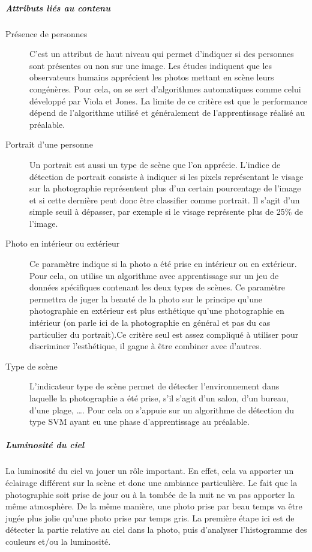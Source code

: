 \documentclass[11pt, french]{report-rd-info}
\begin{document}
\subparagraph{Attributs liés au contenu}
\begin{description}
\item[Présence de personnes]
C’est un attribut de haut niveau qui permet d’indiquer si des personnes sont présentes ou non sur une image. Les études indiquent que les observateurs humains apprécient les photos mettant en scène leurs congénères. Pour cela, on se sert d’algorithmes automatiques comme celui développé par Viola et Jones. La limite de ce critère est que le performance dépend de l’algorithme utilisé et généralement de l’apprentissage réalisé au préalable.


\item[Portrait d'une personne]
Un portrait est aussi un type de scène que l’on apprécie. L’indice de détection de portrait consiste à indiquer si les pixels représentant le visage sur la photographie représentent plus d’un certain pourcentage de l’image et si cette dernière peut donc être classifier comme portrait. Il s’agit d’un simple seuil à dépasser, par exemple si le visage représente plus de 25\% de l’image.


\item[Photo en intérieur ou extérieur]
Ce paramètre indique si la photo a été prise en intérieur ou en extérieur. Pour cela, on utilise un algorithme avec apprentissage sur un jeu de données spécifiques contenant les deux types de scènes. Ce paramètre permettra de juger la beauté de la photo sur le principe qu’une photographie en extérieur est plus esthétique qu’une photographie en intérieur (on parle ici de la photographie en général et pas du cas particulier du portrait).Ce critère seul est assez compliqué à utiliser pour discriminer l’esthétique, il gagne à être combiner avec d’autres.


\item[Type de scène]
L’indicateur type de scène permet de détecter l’environnement dans laquelle la photographie a été prise, s’il s’agit d’un salon, d’un bureau, d’une plage, \ldots. Pour cela on s’appuie sur un algorithme de détection du type SVM ayant eu une phase d’apprentissage au préalable.


\end{description}


\subparagraph{Luminosité du ciel}
La luminosité du ciel va jouer un rôle important. En effet, cela va apporter un éclairage différent sur la scène et donc une ambiance particulière. Le fait que la photographie soit prise de jour ou à la tombée de la nuit ne va pas apporter la même atmosphère. De la même manière, une photo prise par beau temps va être jugée plus jolie qu’une photo prise par temps gris. La première étape ici est de détecter la partie relative au ciel dans la photo, puis d’analyser l’histogramme des couleurs et/ou la luminosité.
\end{document}
